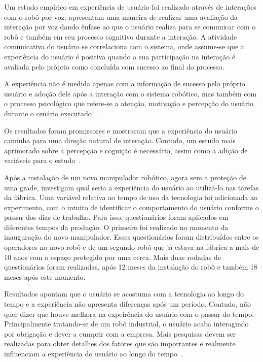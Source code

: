 Um estudo empírico em experiência de usuário foi realizado através de interações com o robô por voz.  apresentam uma maneira de realizar uma avaliação da interação por voz dando ênfase ao que o usuário realiza para se comunicar com o robô e também em seu processo cognitivo durante a interação. A atividade comunicativa do usuário se correlaciona com o sistema, onde assume-se que a experiência do usuário é positiva quando a sua participação na interação é avaliada pelo próprio como concluída com sucesso ao final do processo.

A experiência não é medida apenas com a informação de sucesso pelo próprio usuário e adoção dele após a interação com o sistema robótico, mas também com o processo psicológico que refere-se a atenção, motivação e percepção do usuário durante o cenário executado~\cite{jokinen:2013}.

Os resultados foram promissores e mostraram que a experiência do usuário caminha para uma direção natural de interação. Contudo, um estudo mais aprimorado sobre a percepção e cognição é necessário, assim como a adição de variáveis para o estudo~\cite{jokinen:2013}.

Após a instalação de um novo manipulador robótico, agora sem a proteção de uma grade,  investigam qual seria a experiência do usuário ao utilizá-lo nas tarefas da fábrica. Uma variável relativa ao tempo de uso da tecnologia foi adicionada ao experimento, com o intuito de identificar o comportamento do usuário conforme o passar dos dias de trabalho. Para isso, questionários foram aplicados em diferentes tempos da produção. O primeiro foi realizado no momento da inauguração do novo manipulador. Esses questionários foram distribuídos entre os operadores no novo robô e de um segundo robô que já estava na fábrica a mais de 10 anos com o espaço protegido por uma cerca. Mais duas rodadas de questionários foram realizadas, após 12 meses da instalação do robô e também 18 meses após este momento.

Resultados apontam que o usuário se acostuma com a tecnologia ao longo do tempo e a experiência não apresenta diferenças após um período. Contudo, não quer dizer que houve melhora na expeirência do usuário com o passar do tempo. Principalmente tratando-se de um robô industrial, o usuário acaba interagindo por obrigação e dever a cumprir com a empresa. Mais pesquisas devem ser realizadas para obter detalhes dos fatores que são importantes e realmente influenciam a experiência do usuário ao longo do tempo~\cite{buchner:2013}.

